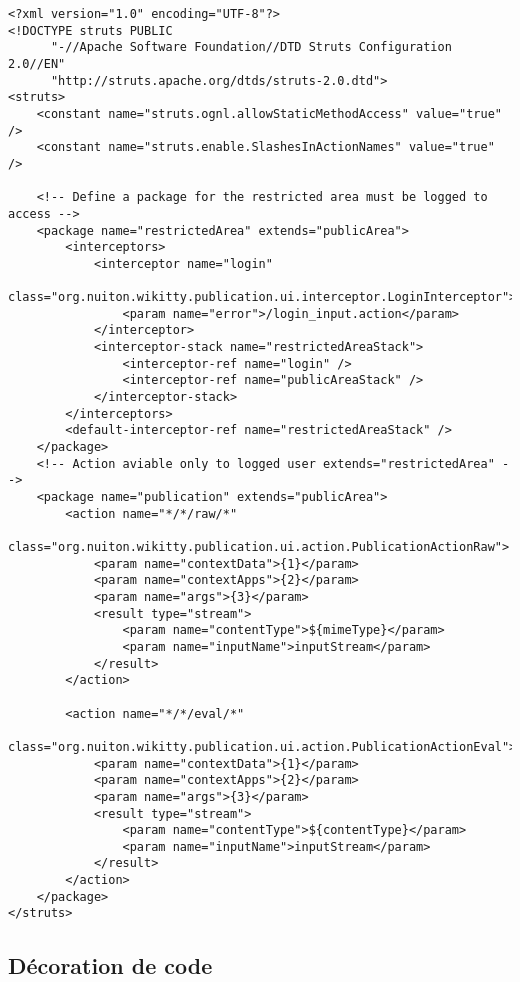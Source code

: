 \begin{lstlisting}
<?xml version="1.0" encoding="UTF-8"?>
<!DOCTYPE struts PUBLIC 
	  "-//Apache Software Foundation//DTD Struts Configuration 2.0//EN"
	  "http://struts.apache.org/dtds/struts-2.0.dtd">
<struts>
    <constant name="struts.ognl.allowStaticMethodAccess" value="true" />
    <constant name="struts.enable.SlashesInActionNames" value="true" />

    <!-- Define a package for the restricted area must be logged to access -->
    <package name="restrictedArea" extends="publicArea">
        <interceptors>
            <interceptor name="login"
                class="org.nuiton.wikitty.publication.ui.interceptor.LoginInterceptor">
                <param name="error">/login_input.action</param>
            </interceptor>
            <interceptor-stack name="restrictedAreaStack">
                <interceptor-ref name="login" />
                <interceptor-ref name="publicAreaStack" />
            </interceptor-stack>
        </interceptors>
        <default-interceptor-ref name="restrictedAreaStack" />
    </package>
    <!-- Action aviable only to logged user extends="restrictedArea" -->
    <package name="publication" extends="publicArea">
        <action name="*/*/raw/*"
            class="org.nuiton.wikitty.publication.ui.action.PublicationActionRaw">
            <param name="contextData">{1}</param>
            <param name="contextApps">{2}</param>
            <param name="args">{3}</param>
            <result type="stream">
                <param name="contentType">${mimeType}</param>
                <param name="inputName">inputStream</param>
            </result>
        </action>

        <action name="*/*/eval/*"
            class="org.nuiton.wikitty.publication.ui.action.PublicationActionEval">
            <param name="contextData">{1}</param>
            <param name="contextApps">{2}</param>
            <param name="args">{3}</param>
            <result type="stream">
                <param name="contentType">${contentType}</param>
                <param name="inputName">inputStream</param>
            </result>
        </action>
    </package>
</struts>
\end{lstlisting}

\clearpage


\subsection*{Décoration de code}

